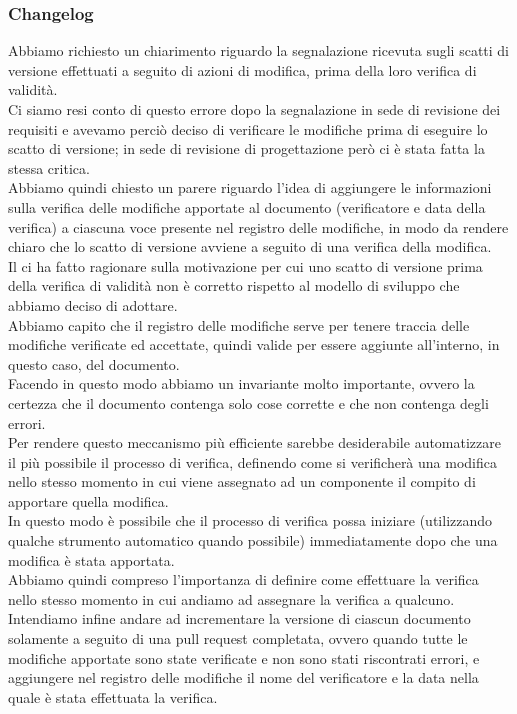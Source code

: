 	\subsubsection*{Changelog}
	Abbiamo richiesto un chiarimento riguardo la segnalazione ricevuta sugli scatti di versione effettuati a seguito di azioni di modifica, prima della loro verifica di validità. \\
	Ci siamo resi conto di questo errore dopo la segnalazione in sede di revisione dei requisiti e avevamo perciò deciso di verificare le modifiche prima di eseguire lo scatto di versione; in sede di revisione di progettazione però ci è stata fatta la stessa critica. \\
	Abbiamo quindi chiesto un parere riguardo l'idea di aggiungere le informazioni sulla verifica delle modifiche apportate al documento (verificatore e data della verifica) a ciascuna voce presente nel registro delle modifiche, in modo da rendere chiaro che lo scatto di versione avviene a seguito di una verifica della modifica. \\
	Il \TV{} ci ha fatto ragionare sulla motivazione per cui uno scatto di versione prima della verifica di validità non è corretto rispetto al modello di sviluppo che abbiamo deciso di adottare. \\
	Abbiamo capito che il registro delle modifiche serve per tenere traccia delle modifiche verificate ed accettate, quindi valide per essere aggiunte all'interno, in questo caso, del documento. \\
	Facendo in questo modo abbiamo un invariante molto importante, ovvero la certezza che il documento contenga solo cose corrette e che non contenga degli errori. \\
	Per rendere questo meccanismo più efficiente sarebbe desiderabile automatizzare il più possibile il processo di verifica, definendo come si verificherà una modifica nello stesso momento in cui viene assegnato ad un componente il compito di apportare quella modifica. \\
	In questo modo è possibile che il processo di verifica possa iniziare (utilizzando qualche strumento automatico quando possibile) immediatamente dopo che una modifica è stata apportata. \\
	Abbiamo quindi compreso l'importanza di definire come effettuare la verifica nello stesso momento in cui andiamo ad assegnare la verifica a qualcuno. \\
	Intendiamo infine andare ad incrementare la versione di ciascun documento solamente a seguito di una pull request completata, ovvero quando tutte le modifiche apportate sono state verificate e non sono stati riscontrati errori, e aggiungere nel registro delle modifiche il nome del verificatore e la data nella quale è stata effettuata la verifica.

	
	
	